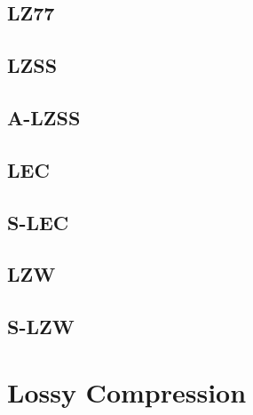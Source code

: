 \subsection{LZ77}
\subsection{LZSS}
\subsection{A-LZSS}

\subsection{LEC}
\subsection{S-LEC}

\subsection{LZW}
\subsection{S-LZW}



\section{Lossy Compression}
